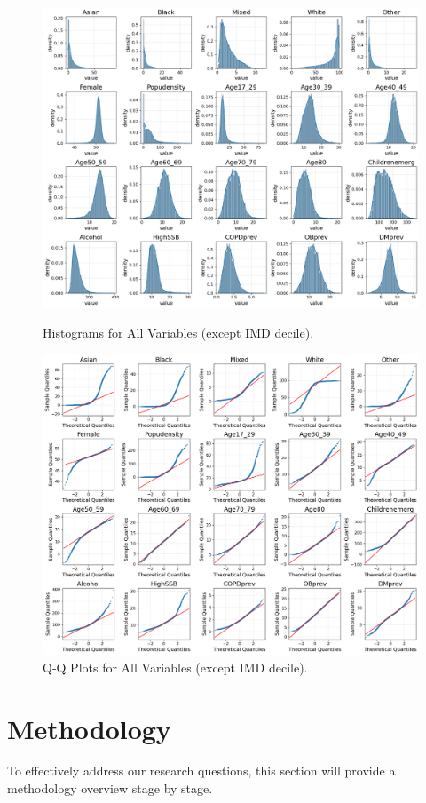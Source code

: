 \begin{figure}[!ht]
  \centering
  
  \includegraphics[width=.85\linewidth]{ucl-latex-thesis-templates-master/Image/data_hist_1.png}
  \caption{Histograms for All Variables (except IMD decile).}
  \label{fig:A3.3}
  
  \vspace{0.5cm} %
  
  \includegraphics[width=.85\linewidth]{ucl-latex-thesis-templates-master/Image/data_qqplot_2.png}
  \caption{Q-Q Plots for All Variables (except IMD decile).}
  \label{fig:A3.4}
  
\end{figure}


\section{Methodology}
\label{sec:3.4}
To effectively address our research questions, this section will provide a methodology overview stage by stage.
